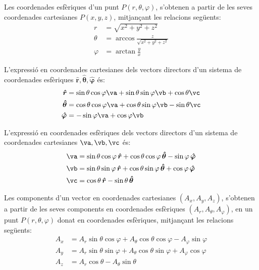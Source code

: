 \documentclass[catalan,a4paper,twoside,11pt]{article}
\begin{document}
Les coordenades  esf\`{e}riques  d'un punt $P(r,\theta,\varphi)$,
s'obtenen a partir de les seves coordenades cartesianes $P(x,y,z)$,
mitjan\c{c}ant les relacions seg\"{u}ents:
\begin{subequations}\begin{align}
    r &=\sqrt{x^2+y^2+z^2}\\
    \theta&=\arccos\frac{z}{\sqrt{x^2+y^2+z^2}}\\
    \varphi &=\arctan\frac{y}{x}
\end{align}\end{subequations}


L'expressi\'{o} en coordenades cartesianes dels vectors directors d'un sistema de coordenades  esf\`{e}riques $\boldsymbol{\hat{r}},\boldsymbol{\hat{\theta}},\boldsymbol{\hat{\varphi}}$ \'{e}s:
\begin{subequations}\begin{align}
    \boldsymbol{\hat{r}} &=\sin\theta\cos\varphi\va+ \sin\theta\sin\varphi\vb+\cos\theta\vc\\
    \boldsymbol{\hat{\theta}} &=\cos\theta\cos\varphi\va+
    \cos\theta\sin\varphi\vb-\sin\theta\vc\\
    \boldsymbol{\hat{\varphi}}&=-\sin\varphi\va+\cos\varphi\vb
\end{align}\end{subequations}

L'expressi\'{o} en coordenades esf\`{e}riques dels vectors directors d'un sistema de coordenades  cartesianes $\va,\vb,\vc$ \'{e}s:
\begin{subequations}\begin{align}
    \va &=\sin\theta\cos\varphi\,\boldsymbol{\hat{r}}+
    \cos\theta\cos\varphi\,\boldsymbol{\hat{\theta}}-\sin\varphi\,\boldsymbol{\hat{\varphi}}\\
    \vb &=\sin\theta\sin\varphi\,\boldsymbol{\hat{r}}+
    \cos\theta\sin\varphi\,\boldsymbol{\hat{\theta}}+\cos\varphi\,\boldsymbol{\hat{\varphi}}\\
    \vc &=\cos\theta\,\boldsymbol{\hat{r}}-\sin\theta\,\boldsymbol{\hat{\theta}}
\end{align}\end{subequations}

Les components d'un vector en coordenades cartesianes $(A_x, A_y, A_z)$, s'obtenen a partir de les seves components en coordenades esf\`{e}riques $(A_r, A_\theta, A_\varphi)$, en un punt $P(r,\theta,\varphi)$ donat en coordenades esf\`{e}riques, mitjan\c{c}ant les relacions seg\"{u}ents:
\begin{subequations}\begin{align}
    A_x &= A_r\sin\theta\cos\varphi+A_\theta\cos\theta\cos\varphi-A_\varphi\sin\varphi \\
    A_y &= A_r\sin\theta\sin\varphi+A_\theta\cos\theta\sin\varphi+A_\varphi\cos\varphi\\
    A_z &= A_r\cos\theta-A_\theta\sin\theta
\end{align}\end{subequations}
\end{document}
